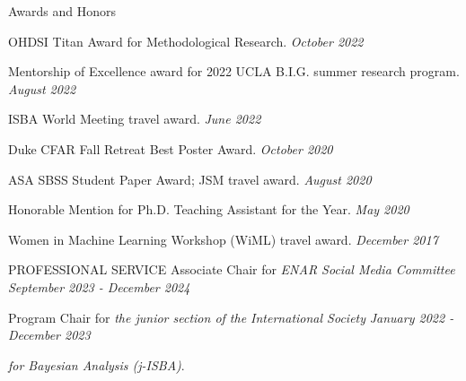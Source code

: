 \documentclass{resume} %
\begin{document}



%


\begin{rSection}{Awards and Honors}

OHDSI Titan Award for Methodological Research. 
\hfill {\em October 2022}

Mentorship of Excellence award for 2022 UCLA B.I.G. summer research program. \hfill {\em August 2022}

ISBA World Meeting travel award.
\hfill {\em June 2022}

Duke CFAR Fall Retreat Best Poster Award. 
\hfill {\em October 2020}

ASA SBSS Student Paper Award; JSM travel award. \hfill {\em August 2020}

Honorable Mention for Ph.D. Teaching Assistant for the Year. 
\hfill {\em May 2020}

Women in Machine Learning Workshop (WiML) travel award. \hfill {\em December 2017}

\end{rSection}



\begin{rSection}{PROFESSIONAL SERVICE}
	Associate Chair for \emph{ENAR Social Media Committee}  \hfill {\em September 2023 - December 2024}

Program Chair for \emph{the junior section of the International Society} \hfill {\em January 2022 - December 2023}

\vspace{-0.1in}
\emph{for Bayesian Analysis (j-ISBA)}.
\end{rSection}
\end{document}
